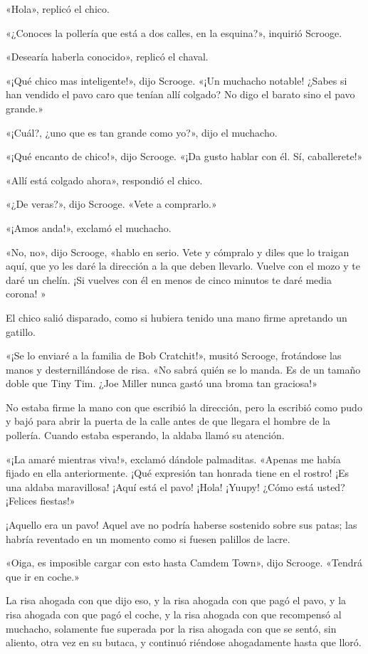 \documentclass{novela}
\begin{document}
 «Hola», replicó el chico.

 «¿Conoces la pollería que está a dos calles, en la esquina?», inquirió Scrooge.

 «Desearía haberla conocido», replicó el chaval.

 «¡Qué chico mas inteligente!», dijo Scrooge. «¡Un muchacho notable! ¿Sabes si han vendido el pavo caro que tenían allí colgado? No digo el barato sino el pavo grande.»

 «¡Cuál?, ¿uno que es tan grande como yo?», dijo el muchacho.

 «¡Qué encanto de chico!», dijo Scrooge. «¡Da gusto hablar con él. Sí, caballerete!»

 «Allí está colgado ahora», respondió el chico.

 «¿De veras?», dijo Scrooge. «Vete a comprarlo.»

 «¡Amos anda!», exclamó el muchacho.

 «No, no», dijo Scrooge, «hablo en serio. Vete y cómpralo y diles que lo traigan aquí, que yo les daré la dirección a la que deben llevarlo. Vuelve con el mozo y te daré un chelín. ¡Si vuelves con él en menos de cinco minutos te daré media corona! »

 El chico salió disparado, como si hubiera tenido una mano firme apretando un gatillo.

 «¡Se lo enviaré a la familia de Bob Cratchit!», musitó Scrooge, frotándose las manos y desternillándose de risa. «No sabrá quién se lo manda. Es de un tamaño doble que Tiny Tim. ¿Joe Miller nunca gastó una broma tan graciosa!»

 No estaba firme la mano con que escribió la dirección, pero la escribió como pudo y bajó para abrir la puerta de la calle antes de que llegara el hombre de la pollería. Cuando estaba esperando, la aldaba llamó su atención.

 «¡La amaré mientras viva!», exclamó dándole palmaditas. «Apenas me había fijado en ella anteriormente. ¡Qué expresión tan honrada tiene en el rostro! ¡Es una aldaba maravillosa! ¡Aquí está el pavo! ¡Hola! ¡Yuupy! ¿Cómo está usted? ¡Felices fiestas!»

 ¡Aquello era un pavo! Aquel ave no podría haberse sostenido sobre sus patas; las habría reventado en un momento como si fuesen palillos de lacre.

 «Oiga, es imposible cargar con esto hasta Camdem Town», dijo Scrooge. «Tendrá que ir en coche.»

 La risa ahogada con que dijo eso, y la risa ahogada con que pagó el pavo, y la risa ahogada con que pagó el coche, y la risa ahogada con que recompensó al muchacho, solamente fue superada por la risa ahogada con que se sentó, sin aliento, otra vez en su butaca, y continuó riéndose ahogadamente hasta que lloró.
\end{document}
